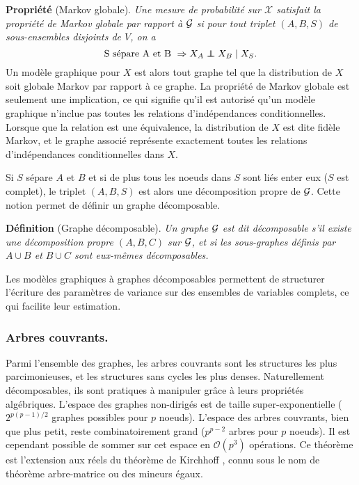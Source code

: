 \textbf{Propriété} (Markov globale). \textit{Une mesure de probabilité sur $\mathcal{X}$ satisfait la propriété de Markov globale  par rapport à $\mathcal{G}$ si pour tout triplet $(A, B, S)$ de sous-ensembles disjoints de $V$, on a
$$\text{S sépare A et B } \Rightarrow X_A\independent X_B \mid X_S.$$ }
Un modèle graphique pour $X$ est alors tout graphe tel que la distribution de $X$ soit globale Markov par rapport à ce graphe. La propriété de Markov globale est seulement une implication, ce qui signifie qu'il est autorisé qu'un modèle graphique n'inclue pas toutes les relations d'indépendances conditionnelles. Lorsque que la relation est une équivalence, la distribution de $X$ est dite fidèle Markov, et le graphe associé représente exactement toutes les relations d'indépendances conditionnelles dans $X$.


Si $S$ sépare $A$ et $B$ et si de plus tous les noeuds dans $S$ sont liés enter eux ($S$ est complet), le triplet $(A,B,S)$ est alors une décomposition propre de $\mathcal{G}$. Cette notion permet de définir un graphe décomposable.


\textbf{Définition} (Graphe décomposable). \textit{Un graphe $\mathcal{G}$ est dit décomposable s'il existe une décomposition propre $(A, B, C)$ sur $\mathcal{G}$, et si les sous-graphes définis par $A\cup B$ et $B\cup C$ sont eux-mêmes décomposables.}


Les modèles graphiques à graphes décomposables permettent de structurer l'écriture des paramètres de variance sur des ensembles de variables complets, ce qui facilite leur estimation. 

\subsubsection*{Arbres couvrants.}
Parmi l'ensemble des graphes, les arbres couvrants sont les structures les plus parcimonieuses, et les structures sans cycles les plus denses. Naturellement décomposables, ils sont pratiques à manipuler grâce à leurs propriétés algébriques. L'espace des graphes non-dirigés est de taille super-exponentielle ($2^{p(p-1)/2}$ graphes possibles pour $p$ noeuds). L'espace des arbres couvrants, bien que plus petit, reste combinatoirement grand ($p^{p-2}$ arbres pour $p$ noeuds). Il est cependant possible de sommer sur cet espace en $\mathcal{O}(p^3)$ opérations. Ce théorème est l'extension aux réels du théorème de Kirchhoff  \citep{matrixtree, MeilaJaak}, connu sous le nom de théorème arbre-matrice ou des mineurs égaux. \\


